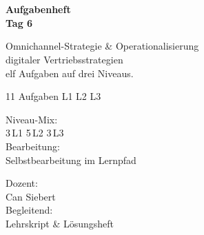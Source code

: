 \documentclass[11pt,a4paper,oneside]{article}
\begin{document}
\begin{titlepage}
  \pagestyle{empty}
  \vspace*{1.5cm}
  \\[2pt]
  \noindent{\color{lpAccent}\rule{\linewidth}{1.2pt}}\\[4pt]

  \vspace{3cm}
  {\sffamily\fontsize{30}{34}\selectfont\bfseries\color{lpInk}Aufgabenheft\\Tag 6\par}

  \vspace{0.7cm}
  {\sffamily\large\color{lpGray}Omnichannel-Strategie \& Operationalisierung\\digitaler Vertriebsstrategien\\\textendash{} elf Aufgaben auf drei Niveaus.\par}

  \vspace{1.5cm}
  {\caveatfont\LARGE\color{lpAmber}11 Aufgaben \textperiodcentered{} L1 \textperiodcentered{} L2 \textperiodcentered{} L3}\par

  \vfill

  \noindent\begin{minipage}{0.55\linewidth}
    {\sffamily\footnotesize\color{lpGray}Niveau-Mix:}\\
    {\sffamily\small\color{lpInk}3\,\textsf{L1} \textperiodcentered{} 5\,\textsf{L2} \textperiodcentered{} 3\,\textsf{L3}}\\[10pt]
    {\sffamily\footnotesize\color{lpGray}Bearbeitung:}\\
    {\sffamily\small\color{lpInk}Selbstbearbeitung im Lernpfad}
  \end{minipage}\hfill
  \begin{minipage}{0.4\linewidth}
    \raggedleft
    {\sffamily\footnotesize\color{lpGray}Dozent:}\\
    {\sffamily\small\color{lpInk}Can Siebert}\\[10pt]
    {\sffamily\footnotesize\color{lpGray}Begleitend:}\\
    {\sffamily\small\color{lpInk}Lehrskript \& Lösungsheft}
  \end{minipage}

  \vspace{0.5cm}
  \noindent{\color{lpAccent}\rule{\linewidth}{0.6pt}}
\end{titlepage}
\end{document}
